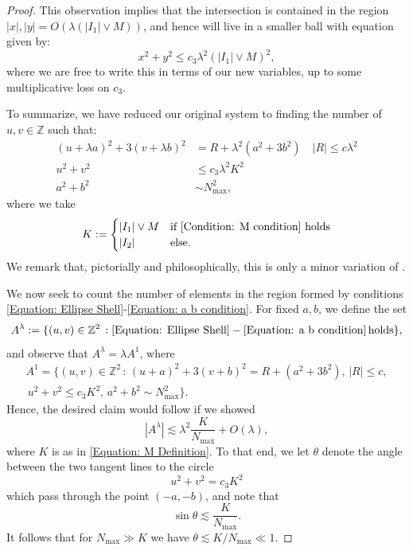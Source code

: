 \documentclass[12pt, letterpaper]{amsart}
\begin{document}
\begin{proof}
    This observation implies that the intersection is contained in the region $|x|, |y| = O(\lambda(|I_1|\vee M))$, and hence will live in a smaller ball with equation given by:
    \[
    x^2+y^2\leq c_3\lambda^2(|I_1|\vee M)^2,
    \]
    where we are free to write this in terms of our new variables, up to some multiplicative loss on $c_3$.
    
    To summarize, we have reduced our original system to finding the number of $u,v\in\mathbb{Z}$ such that:
    \begin{align}
        (u+\lambda a)^2+3(v+\lambda b)^2&= R +\lambda^2\left(a^2 + 3b^2\right)\quad |R|\leq c\lambda^2\label{Equation: Ellipse Shell}\\
        u^2+v^2&\leq c_3\lambda^2 K^2\label{Equation: Circle}\\
        a^2+b^2&\sim N_{\max}^2\label{Equation: a b condition},
    \end{align}
    where we take
    \begin{equation}\label{Equation: M Definition}
K := \begin{cases}
    |I_1|\vee M & \mbox{if }\eqref{Condition: M condition} \mbox{ holds}\\
    |I_2| & \mbox{else}.
\end{cases}
    \end{equation}
    We remark that, pictorially and philosophically, this is only a minor variation of \cite[Figures 2 \& 3]{de2007global}.

    We now seek to count the number of elements in the region formed by conditions \eqref{Equation: Ellipse Shell}-\eqref{Equation: a b condition}. For fixed $a,b$, we define the set 
    \[
    A^\lambda := \{(u,v)\in\mathbb{Z}^2\,:\eqref{Equation: Ellipse Shell}-\eqref{Equation: a b condition}\,\mathrm{holds}\},
    \]
    and observe that $A^\lambda = \lambda A^1$, where
    \begin{multline*}
    A^1 = \{(u,v)\in\mathbb{Z}^2\,:\,(u+a)^2+3(v+b)^2= R +\left(a^2 + 3b^2\right),\,|R|\leq c,\\
    \,u^2+v^2\leq c_3K^2,\,a^2+b^2\sim N_{\max}^2\}.
    \end{multline*}
    Hence, the desired claim would follow if we showed
    \begin{equation}\label{Equation: Desired Bound}
|A^\lambda|\lesssim \lambda^2\frac{K}{N_{\max}} + O(\lambda),
    \end{equation}
    where $K$ is as in \eqref{Equation: M Definition}. To that end, we let $\theta$ denote the angle between the two tangent lines to the circle
    \[
    u^2+v^2= c_3K^2
    \]
    which pass through the point $(-a,-b)$, and note that
    \[
    \sin\theta \lesssim \frac{K}{N_{\max}}.
    \]
    It follows that for $N_{\max}\gg K$ we have $\theta \lesssim K/N_{\max}\ll 1$. 
    

\end{proof}
\end{document}
